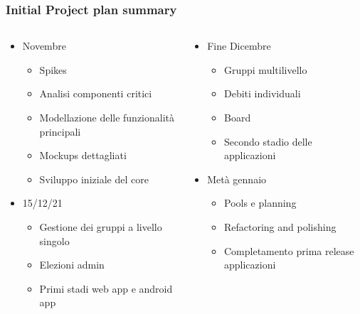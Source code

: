 \documentclass[11pt]{beamer}
\begin{document}
	\begin{frame}
		\frametitle{Initial Project plan summary}
		\begin{columns}
			\begin{column}{.45\linewidth}
				\begin{itemize}
					\item Novembre
					\begin{itemize}
						\item Spikes
						\item Analisi componenti critici 
						\item Modellazione delle funzionalità principali
						\item Mockups dettagliati
						\item Sviluppo iniziale del core
					\end{itemize}
					\item 15/12/21
					\begin{itemize}
						\item Gestione dei gruppi a livello singolo
						\item Elezioni admin
						\item Primi stadi web app e android app
					\end{itemize}
				\end{itemize}
			\end{column}
			\begin{column}{.45\linewidth}
				\begin{itemize}
					\item Fine Dicembre
					\begin{itemize}
						\item Gruppi multilivello
						\item Debiti individuali
						\item Board
						\item Secondo stadio delle applicazioni
					\end{itemize}
					\item Metà gennaio
					\begin{itemize}
						\item Pools e planning
						\item Refactoring and polishing
						\item Completamento prima release applicazioni
					\end{itemize}
				\end{itemize}
			\end{column}
		\end{columns}
		

\end{frame}
\end{document}
